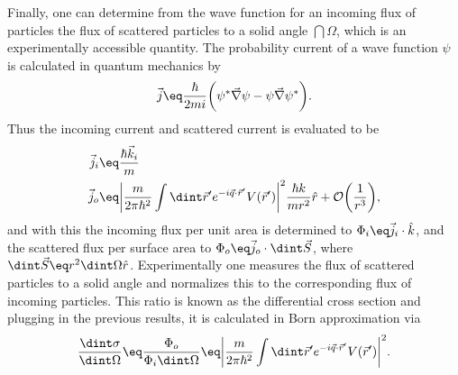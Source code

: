 \documentclass[\main/dresen_thesis.tex]{subfiles}
\begin{document}
Finally, one can determine from the wave function for an incoming flux of particles the flux of scattered particles to a solid angle $\dint \Omega$, which is an experimentally accessible quantity.  The probability current of a wave function $\psi$  is calculated in quantum mechanics by
\begin{align}
  \vec{j} \eq \frac{\hbar}{2mi} \bigg( \psi^* \vec{\nabla} \psi - \psi \vec{\nabla} \psi^* \bigg).
\end{align}
Thus the incoming current and scattered current is evaluated to be
\begin{align}
  \vec{j}_i &\eq \frac{\hbar \vec{k}_i}{m}\\
  \vec{j}_o &\eq \bigg| \frac{m}{2 \pi\hbar^2} \int \dint \vec{r}^\prime e^{-i\vec{q} \cdot \vec{r}^\prime} V (\vec{r}^\prime) \bigg|^2 \frac{\hbar k}{m r^2} \hat{r} + \mathcal{O} \bigg(\frac{1}{r^3}\bigg),\\
\end{align}
and with this the incoming flux per unit area is determined to $\Phi_i \eq \vec{j}_i \cdot \hat{k}$, and the scattered flux per surface area to $\Phi_o \eq \vec{j}_o \cdot \dint \vec{S}$, where $\dint \vec{S} \eq r^2 \dint \Omega \hat{r}$.
Experimentally one measures the flux of scattered particles to a solid angle and normalizes this to the corresponding flux of incoming particles. This ratio is known as the differential cross section and plugging in the previous results, it is calculated in Born approximation via
\begin{align}
  \frac{\dint \sigma}{\dint \Omega} \eq \frac{\Phi_o}{\Phi_i \dint \Omega} \eq \bigg| \frac{m}{2 \pi\hbar^2} \int \dint \vec{r}^\prime e^{-i\vec{q} \cdot \vec{r}^\prime} V (\vec{r}^\prime) \bigg|^2.\label{eq:theoreticalBackground:scattering:scatteringTheory:differentialCrossSectionIntegralOverPotential}
\end{align}
\end{document}
